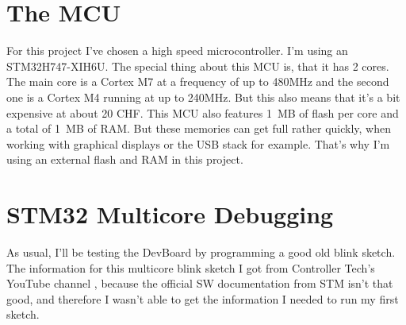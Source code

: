 \newpage
\section{The MCU}
For this project I've chosen a high speed microcontroller. I'm using an STM32H747-XIH6U. The special thing about this MCU is, that it has 2 cores. The main core is a Cortex M7 at a frequency of up to 480MHz and the second one is a Cortex M4 running at up to 240MHz. But this also means that it's a bit expensive at about 20 CHF. This MCU also features 1 MB of flash per core and a total of 1 MB of RAM. But these memories can get full rather quickly, when working with graphical displays or the USB stack for example. That's why I'm using an external flash and RAM in this project.


\section{STM32 Multicore Debugging}
As usual, I'll be testing the DevBoard by programming a good old blink sketch. The information for this multicore blink sketch I got from Controller Tech's YouTube channel \cite{YT_CT_Mutlicore_Debugging}, because the official SW documentation from STM isn't that good, and therefore I wasn't able to get the information I needed to run my first sketch.

